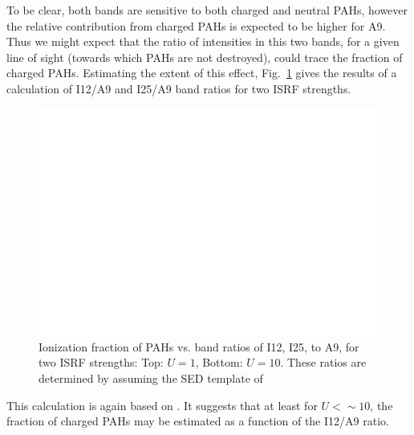         To be clear, both bands are sensitive to both charged and neutral PAHs, however the relative contribution from charged PAHs is expected to be higher for A9. Thus we might expect that the ratio of intensities in this two bands, for a given line of sight (towards which PAHs are not destroyed), could trace the fraction of charged PAHs. Estimating the extent of this effect, Fig.~\ref{fig:band-ratio-multiple} gives the results of a calculation of I12/A9 and I25/A9 band ratios for two ISRF strengths.
          \begin{figure}
              \centering
              \includegraphics[width=\textwidth]{../Plots/ch_datasources/band-ratio-multiple.pdf}
              \caption{Ionization fraction of PAHs vs. band ratios of I12, I25, to A9, for two ISRF strengths: Top: $U = 1$, Bottom: $U = 10$. These ratios are determined by assuming the SED template of \cite{dustem11} }
              \label{fig:band-ratio-multiple}
          \end{figure}
        This calculation is again based on \cite{dustem11}. It suggests that at least for $U<\sim{}10$, the fraction of charged PAHs may be estimated as a function of the I12/A9 ratio.


